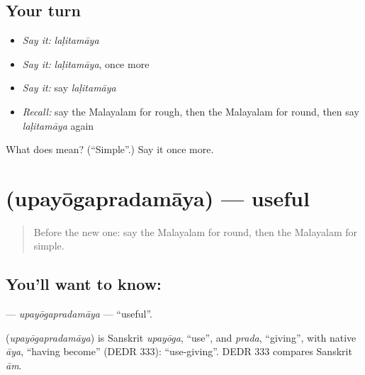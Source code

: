 \subsection*{Your turn}
\begin{itemize}
\raggedright
  \item \emph{Say it:} \emph{laḷitamāya}
  \item \emph{Say it:} \emph{laḷitamāya}, once more
  \item \emph{Say it:} say \emph{laḷitamāya}
  \item \emph{Recall:} say the Malayalam for rough, then the Malayalam for round, then say \emph{laḷitamāya} again
\end{itemize}

\begin{tcolorbox}[breakable,colback=teal!4,colframe=teal!35!black,title={Before you move on}]
What does  mean? (\textquotedblleft{}Simple\textquotedblright{}.) Say it once more.
\end{tcolorbox}
\section[\texorpdfstring{\ml{ഉപയോഗപ്രദമായ} (upayōgapradamāya)}{ഉപയോഗപ്രദമായ (upayōgapradamāya)}]{ (upayōgapradamāya) — useful}

\label{lesson:ML-C205-upayogapradamaya}



\begin{quote}
Before the new one: say the Malayalam for round, then the Malayalam for simple.
\end{quote}

\subsection*{You'll want to know: }
\textbf{} — \emph{upayōgapradamāya} — \textquotedblleft{}useful\textquotedblright{}.

\begin{cousinweb}
\textbf{} (\emph{upayōgapradamāya}) is Sanskrit \emph{upayōga}, \textquotedblleft{}use\textquotedblright{}, and \emph{prada}, \textquotedblleft{}giving\textquotedblright{}, with native \emph{āya}, \textquotedblleft{}having become\textquotedblright{} (DEDR 333): \textquotedblleft{}use-giving\textquotedblright{}. DEDR 333 compares Sanskrit \emph{ām}.
\end{cousinweb}

